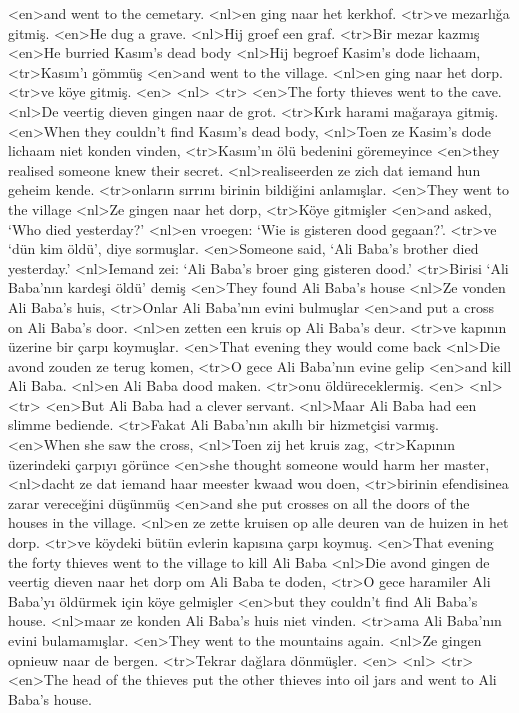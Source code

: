 <en>and went to the cemetary.
<nl>en ging naar het kerkhof. 
<tr>ve mezarlığa gitmiş.
<en>He dug a grave.
<nl>Hij groef een graf. 
<tr>Bir mezar kazmış
<en>He burried Kasım’s dead body
<nl>Hij begroef Kasim's dode lichaam, 
<tr>Kasım’ı gömmüş
<en>and went to the village.
<nl>en ging naar het dorp.
<tr>ve köye gitmiş.
<en>
<nl>
<tr>
<en>The forty thieves went to the cave.
<nl>De veertig dieven gingen naar de grot. 
<tr>Kırk harami mağaraya gitmiş.
<en>When they couldn’t find Kasım’s dead body,
<nl>Toen ze Kasim's  dode lichaam niet konden vinden, 
<tr>Kasım’ın ölü bedenini göremeyince
<en>they realised someone knew their secret. 
<nl>realiseerden ze zich dat iemand hun geheim kende. 
<tr>onların sırrını birinin bildiğini anlamışlar. 
<en>They went to the village
<nl>Ze gingen naar het dorp, 
<tr>Köye gitmişler
<en>and asked, `Who died yesterday?'
<nl>en vroegen: `Wie is gisteren dood gegaan?'.
<tr>ve `dün kim öldü', diye sormuşlar.
<en>Someone said,  `Ali Baba’s brother died yesterday.'
<nl>Iemand zei: `Ali Baba's broer ging gisteren dood.' 
<tr>Birisi `Ali Baba’nın kardeşi öldü' demiş
<en>They found Ali Baba’s house
<nl>Ze vonden Ali Baba's huis, 
<tr>Onlar Ali Baba’nın evini bulmuşlar
<en>and put a cross on Ali Baba’s door.
<nl>en zetten een kruis op Ali Baba's deur. 
<tr>ve kapının üzerine bir çarpı koymuşlar.
<en>That evening they would come back
<nl>Die avond zouden ze terug komen, 
<tr>O gece Ali Baba’nın evine gelip
<en>and kill Ali Baba.
<nl>en Ali Baba dood maken. 
<tr>onu öldüreceklermiş.
<en>
<nl>
<tr>
<en>But Ali Baba had a clever servant.
<nl>Maar Ali Baba had een slimme bediende. 
<tr>Fakat Ali Baba’nın akıllı bir hizmetçisi varmış.
<en>When she saw the cross,
<nl>Toen zij het kruis zag, 
<tr>Kapının üzerindeki çarpıyı görünce
<en>she thought someone would harm her master,
<nl>dacht ze dat iemand haar meester kwaad wou doen, 
<tr>birinin efendisinea zarar vereceğini düşünmüş
<en>and she put crosses on all the doors of the houses in the village.
<nl>en ze zette kruisen op alle deuren van de huizen in het dorp. 
<tr>ve köydeki bütün evlerin kapısına çarpı koymuş.
<en>That evening the forty thieves went to the village to kill Ali Baba
<nl>Die avond gingen de veertig dieven naar het dorp om Ali Baba te doden, 
<tr>O gece haramiler Ali Baba’yı öldürmek için köye gelmişler
<en>but they couldn’t find Ali Baba’s house.
<nl>maar ze konden Ali Baba's huis niet vinden. 
<tr>ama Ali Baba’nın evini bulamamışlar.
<en>They went to the mountains again.
<nl>Ze gingen opnieuw naar de bergen. 
<tr>Tekrar dağlara  dönmüşler.
<en>
<nl>
<tr>
<en>The head of the thieves put the other thieves into oil jars and went to Ali Baba’s house.
